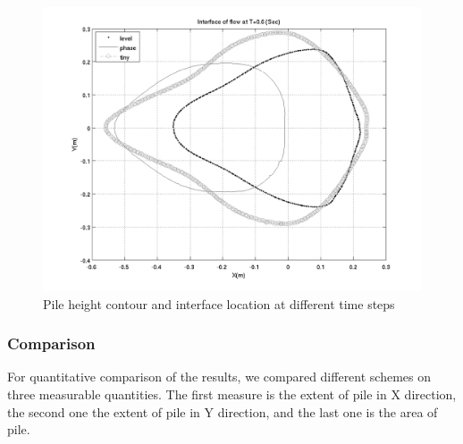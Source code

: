 \documentclass[letterpaper,10pt]{article}
\begin{document}
\begin{figure}[H]
\begin{minipage}[b]{.48 \linewidth}
    \includegraphics[width=1\textwidth]{IMAGES/interface60.png}
  \end{minipage}
  \caption{Pile height contour and interface location at different time steps}
  \label{odinary}
\end{figure}

\subsubsection{Comparison}

For quantitative comparison of the results, we compared different schemes on three measurable quantities. The first measure is the extent of pile in X direction, the second one the extent of pile in Y direction, and the last one is the area of pile.
\end{document}

